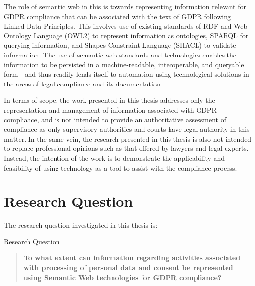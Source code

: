 The role of semantic web in this is towards representing information relevant for GDPR compliance that can be associated with the text of GDPR following Linked Data Principles.
This involves use of existing standards of RDF \cite{RDF} and Web Ontology Language (OWL2) \cite{OWL} to represent information as ontologies, SPARQL \cite{SPARQL} for querying information, and Shapes Constraint Language (SHACL) \cite{SHACL} to validate information.
The use of semantic web standards and technologies enables the information to be persisted in a machine-readable, interoperable, and queryable form - and thus readily lends itself to automation using technological solutions in the areas of legal compliance and its documentation.


In terms of scope, the work presented in this thesis addresses only the representation and management of information associated with GDPR compliance, and is not intended to provide an authoritative assessment of compliance as only supervisory authorities and courts have legal authority in this matter.
In the same vein, the research presented in this thesis is also not intended to replace professional opinions such as that offered by lawyers and legal experts.
Instead, the intention of the work is to demonstrate the applicability and feasibility of using technology as a tool to assist with the compliance process.

\section{Research Question}\label{sec:intro:RQ}
The research question investigated in this thesis is:
\begin{framed}
\small{Research Question}
\begin{quote}
\textbf{To what extent can information regarding activities associated with processing of personal data and consent be represented using Semantic Web technologies for GDPR compliance?}
\end{quote}
\end{framed}

